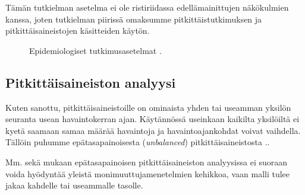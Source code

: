 \documentclass[finnish]{docopts}
\begin{document}
Tämän tutkielman asetelma ei ole ristiriidassa edellämainittujen näkökulmien kanssa, joten tutkielman piirissä omaksumme pitkittäistutkimuksen ja pitkittäisaineistojen käsitteiden käytön. 

\begin{figure}
\centering
{}
\caption{Epidemiologiset tutkimusasetelmat \citep{twisk13}.}
\label{fig:epikaavio}
\end{figure}

\subsection{Pitkittäisaineiston analyysi}
\label{sub:pitkittaisanal}

Kuten sanottu, pitkittäisaineistoille on ominaista yhden tai useamman yksilön seuranta usean havaintokerran ajan. Käytännössä useinkaan kaikilta yksilöiltä ei kyetä saamaan samaa määrää havaintoja ja havaintoajankohdat voivat vaihdella. Tällöin puhumme epätasapainoisesta (\textit{unbalanced}) pitkittäisaineistosta .\cite{laird82}.

Mm. \cite{verbeke00} sekä \cite{goldstein11} mukaan epätasapainoisen pitkittäisaineiston analyysissa ei suoraan voida hyödyntää yleistä monimuuttujamenetelmien kehikkoa, vaan malli tulee jakaa kahdelle tai useammalle tasolle. 
\end{document}
